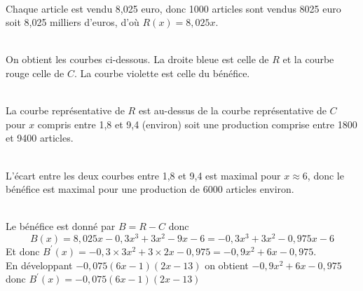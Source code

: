 \documentclass[12pt,a4paper]{book}
\begin{document}
\begin{enumMet}
    \item {}
    \begin{enumMet}
        \item {}\\
        Chaque article est vendu 8,025 euro, donc 1000 articles sont vendus 8025 euro soit 8,025 milliers d'euros, d'où $R(x)=8,025 x$.
        \item {}\\
    On obtient les courbes ci-dessous. La droite bleue est celle de $R$ et la courbe rouge celle de $C$. La courbe violette est celle du bénéfice.
        \item {}\\
    La courbe représentative de $R$ est au-dessus de la courbe représentative de $C$ pour $x$ compris entre 1,8 et 9,4 (environ) soit une production comprise entre 1800 et 9400 articles.
        \item {}\\
        L'écart entre les deux courbes entre 1,8 et 9,4 est maximal pour $x \approx 6$, donc le bénéfice est maximal pour une production de 6000 articles environ.
    \end{enumMet}
    \item {}
    \begin{enumMet}
        \item {}\\
    Le bénéfice est donné par $B=R-C$ donc
    $$
    B(x)=8,025 x-0,3 x^{3}+3 x^{2}-9 x-6=-0,3 x^{3}+3 x^{2}-0,975 x-6
    $$
    Et donc $B^{\prime}(x)=-0,3 \times 3 x^{2}+3 \times 2 x-0,975=-0,9 x^{2}+6 x-0,975$.\\
    En développant $-0,075(6 x-1)(2 x-13)$ on obtient $-0,9 x^{2}+6 x-0,975$ donc $B^{\prime}(x)=-0,075(6 x-1)(2 x-13)$

\end{enumMet}
\end{enumMet}
\end{document}
